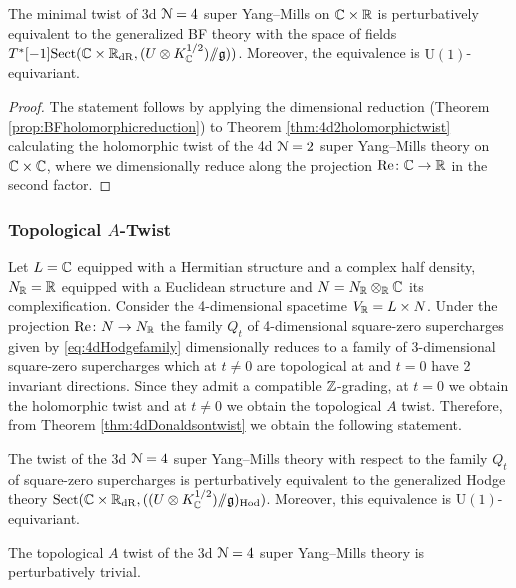 \documentclass[10pt, oneside]{article}
\renewcommand{\Re}{\mathrm{Re}}
\newcommand{\Sect}{\mathrm{Sect}}
\renewcommand{\U}{\mathrm{U}}
\newcommand{\ham}{/\!\!/}
\begin{document}
\begin{theorem} \label{3d_4_minimal_twist_thm}
The minimal twist of 3d $\mathcal N=4$ super Yang--Mills on $\mathbb C\times \mathbb R$ is perturbatively equivalent to the generalized BF theory with the space of fields $T^*[-1]\Sect(\CC \times \RR_{\mr{dR}}, (U \otimes K^{1/2}_\CC) \ham \gg))$. Moreover, the equivalence is $\U(1)$-equivariant.
\end{theorem}
\begin{proof}
The statement follows by applying the dimensional reduction (Theorem \ref{prop:BFholomorphicreduction}) to Theorem \ref{thm:4d2holomorphictwist} calculating the holomorphic twist of the 4d $\mathcal{N}=2$ super Yang--Mills theory on $\mathbb C\times\mathbb C$, where we dimensionally reduce along the projection $\Re\colon\CC\rightarrow \RR$ in the second factor.
\end{proof}

\subsubsection{Topological $A$-Twist}
\label{sect:3d_4_A_twist}
Let $L=\mathbb C$ equipped with a Hermitian structure and a complex half density, $N_\mathbb R=\mathbb R$ equipped with a Euclidean structure and $N=N_\mathbb R\otimes_\mathbb R\mathbb C$ its complexification. Consider the 4-dimensional spacetime $V_\mathbb R=L\times N$. Under the projection $\Re\colon N\rightarrow N_\RR$ the family $Q_t$ of 4-dimensional square-zero supercharges given by \eqref{eq:4dHodgefamily} dimensionally reduces to a family of 3-dimensional square-zero supercharges which at $t\neq 0$ are topological at and $t=0$ have 2 invariant directions. Since they admit a compatible $\mathbb Z$-grading, at $t=0$ we obtain the holomorphic twist and at $t\neq 0$ we obtain the topological $A$ twist. Therefore, from Theorem \ref{thm:4dDonaldsontwist} we obtain the following statement.

\begin{theorem}
The twist of the 3d $\mathcal N=4$ super Yang--Mills theory with respect to the family $Q_t$ of square-zero supercharges is perturbatively equivalent to the generalized Hodge theory $\mr{Sect}(\CC \times \RR_{\mr{dR}}, ((U \otimes K^{1/2}_\CC)\ham \gg)_{\mr{Hod}})$. Moreover, this equivalence is $\U(1)$-equivariant.
\label{3d_4_A_twist_thm}
\end{theorem}

\begin{corollary}
The topological $A$ twist of the 3d $\mathcal N=4$ super Yang--Mills theory is perturbatively trivial.
\end{corollary}
\end{document}
